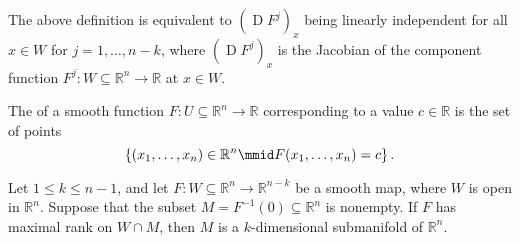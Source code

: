 \documentclass[notoc,notitlepage]{tufte-book}
\DeclareMathOperator{\D}{D}
\begin{document}
\begin{note}
  The above definition is equivalent to $(\D F^j)_x$ being linearly independent
  for all $x \in W$ for $j = 1, \ldots, n - k$, where $(\D F^j)_x$ is the
  Jacobian of the component function $F^j : W \subseteq \mathbb{R}^n \to
  \mathbb{R}$ at $x \in W$.
\end{note}

\begin{defn}\label{defn:level_set}
  The  of a smooth function $F : U \subseteq \mathbb{R}^n \to
  \mathbb{R}$  corresponding to a value
  $c \in \mathbb{R}$ is the set of points \cite{weisstein-mathworld}
  \begin{equation*}
    \left\{ (x_1, \ldots, x_n) \in \mathbb{R}^n \mmid F(x_1, \ldots, x_n) = c
    \right\}.
  \end{equation*}
\end{defn}

\begin{thm}\label{thm:submanifold_as_defined_by_a_smooth_map_of_maximal_rank}
  Let $1 \leq k \leq n - 1$, and let $F : W \subseteq \mathbb{R}^n \to
  \mathbb{R}^{n - k}$ be a smooth map, where $W$ is open in $\mathbb{R}^n$.
  Suppose that the subset $M = F^{-1}(0) \subseteq \mathbb{R}^n$ is nonempty. If
  $F$ has maximal rank on $W \cap M$, then $M$ is a $k$-dimensional submanifold
  of $\mathbb{R}^n$.
\end{thm}
\end{document}
